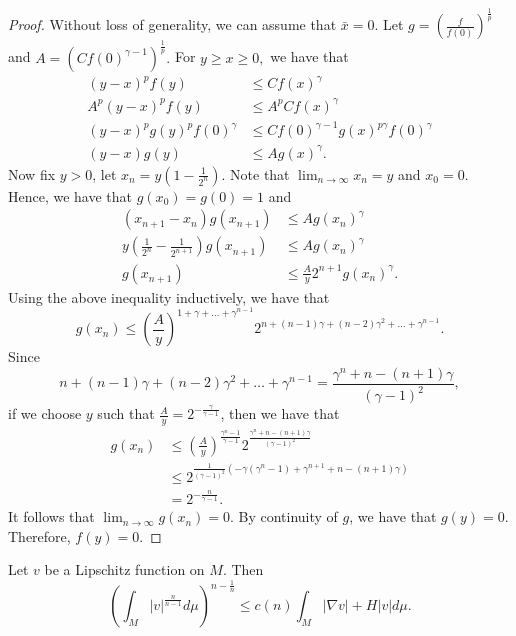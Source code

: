 \begin{proof}
	Without loss of generality, we can assume that $\bar{x}=0.$ 
	Let $g=(\frac{f}{f(0)})^{\frac{1}{p}}$ and $A=(Cf(0)^{\gamma -1})^{\frac{1}{p}}.$ For $y \geq x \geq 0,$ we have that
	\begin{align*}
		(y-x)^{p}f(y) &\leq Cf(x)^{\gamma }\\
		A^p (y-x)^{p}f(y) &\leq A^p Cf(x)^{\gamma }\\
		(y-x)^p g(y)^p f(0)^{\gamma } &\leq C f(0)^{\gamma-1 }g(x)^{p \gamma } f(0)^{\gamma }\\
		(y-x)g(y) &\leq A g(x)^{\gamma }.
	\end{align*}
	Now fix $y>0$, let $x_n=y(1-\frac{1}{2^n})$. Note that $\lim_{n \to \infty} x_n=y$ and $x_0=0.$ Hence, we have that $g(x_0)=g(0)=1$ and 
	\begin{align*}
		(x_{n+1}-x_n)g(x_{n+1}) &\leq Ag(x_{n}^{} )^{\gamma }\\
		y(\frac{1}{2^{n}}-\frac{1}{2^{n+1}})g(x_{n+1}^{} ) &\leq Ag(x_{n}^{} )^{\gamma }\\
		g(x_{n+1}^{} ) &\leq \frac{A}{y}2^{n+1} g(x_{n}^{} )^{\gamma }.
	\end{align*} 
	Using the above inequality inductively, we have that \[g(x_{n}^{} ) \leq (\frac{A}{y})^{1+\gamma + \dots + \gamma ^{n-1}} 2^{n+(n-1)\gamma + (n-2)\gamma ^2 + \dots + \gamma ^{n-1}}.\]
	Since \[n+(n-1)\gamma + (n-2)\gamma ^2 + \dots + \gamma ^{n-1}=\frac{\gamma ^n+n-(n+1)\gamma }{(\gamma -1)^2},\]
	if we choose $y$ such that $\frac{A}{y}=2^{-\frac{\gamma }{\gamma -1}}$, then we have that 
	\begin{equation*}
	\begin{split}
		g(x_{n}^{} ) 
	&\leq  (\frac{A}{y})^{\frac{\gamma ^n-1}{\gamma -1}} 2^{\frac{\gamma ^n+n-(n+1)\gamma }{(\gamma -1)^2}} \\
	&\leq 2^{\frac{1}{(\gamma -1)^2}(-\gamma (\gamma ^n-1)+\gamma ^{n+1}+n-(n+1)\gamma )}\\
	&=2^{-\frac{n}{\gamma -1}}.
	\end{split}
	\end{equation*}
	It follows that $\lim_{n \to \infty} g(x_n)=0$. By continuity of $g$, we have that $g(y)=0.$ Therefore, $f(y)=0.$  
\end{proof}

\begin{lemma} \label{MSeu}
    Let $v$ be a Lipschitz function on $M$. Then
    \[\left( \int_{M}^{}\left| v \right| ^{\frac{n}{n-1}} d \mu  \right)^{n-\frac{1}{n}} \leq c(n)\int_{M}^{} \left| \nabla v \right| + H \left| v \right|  d \mu. \]
\end{lemma}

